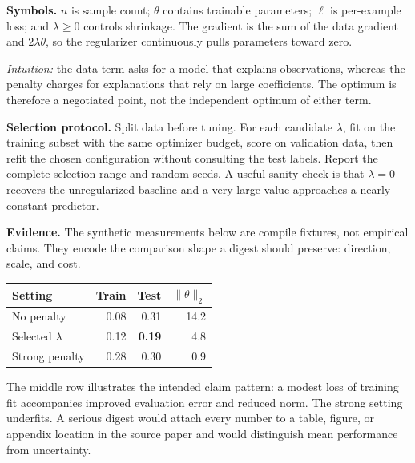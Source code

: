 \documentclass[10pt,letterpaper,twocolumn]{article}
\renewcommand{\section}[1]{\vspace{2pt}\textbf{#1.}\hspace{0.30em}}
\begin{document}
\textbf{Symbols.} $n$ is sample count; $\theta$ contains trainable parameters; $\ell$ is per-example loss; and $\lambda\geq0$ controls shrinkage. The gradient is the sum of the data gradient and $2\lambda\theta$, so the regularizer continuously pulls parameters toward zero.

\textit{Intuition:} the data term asks for a model that explains observations, whereas the penalty charges for explanations that rely on large coefficients. The optimum is therefore a negotiated point, not the independent optimum of either term.

\section{Selection protocol}
Split data before tuning. For each candidate $\lambda$, fit on the training subset with the same optimizer budget, score on validation data, then refit the chosen configuration without consulting the test labels. Report the complete selection range and random seeds. A useful sanity check is that $\lambda=0$ recovers the unregularized baseline and a very large value approaches a nearly constant predictor.

\section{Evidence}
The synthetic measurements below are compile fixtures, not empirical claims. They encode the comparison shape a digest should preserve: direction, scale, and cost.

\begin{center}
\begin{tabularx}{\columnwidth}{@{}Xrrr@{}}
\toprule
Setting & Train & Test & $\lVert\theta\rVert_2$ \\
\midrule
No penalty & 0.08 & 0.31 & 14.2 \\
Selected $\lambda$ & 0.12 & \textbf{0.19} & 4.8 \\
Strong penalty & 0.28 & 0.30 & 0.9 \\
\bottomrule
\end{tabularx}
\end{center}

The middle row illustrates the intended claim pattern: a modest loss of training fit accompanies improved evaluation error and reduced norm. The strong setting underfits. A serious digest would attach every number to a table, figure, or appendix location in the source paper and would distinguish mean performance from uncertainty.
\end{document}
